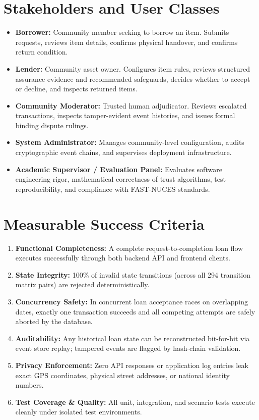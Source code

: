 \section{Stakeholders and User Classes}
\begin{itemize}
    \item \textbf{Borrower:} Community member seeking to borrow an item. Submits requests, reviews item details, confirms physical handover, and confirms return condition.
    \item \textbf{Lender:} Community asset owner. Configures item rules, reviews structured assurance evidence and recommended safeguards, decides whether to accept or decline, and inspects returned items.
    \item \textbf{Community Moderator:} Trusted human adjudicator. Reviews escalated transactions, inspects tamper-evident event histories, and issues formal binding dispute rulings.
    \item \textbf{System Administrator:} Manages community-level configuration, audits cryptographic event chains, and supervises deployment infrastructure.
    \item \textbf{Academic Supervisor / Evaluation Panel:} Evaluates software engineering rigor, mathematical correctness of trust algorithms, test reproducibility, and compliance with FAST-NUCES standards.
\end{itemize}

\section{Measurable Success Criteria}
\begin{enumerate}
    \item \textbf{Functional Completeness:} A complete request-to-completion loan flow executes successfully through both backend API and frontend clients.
    \item \textbf{State Integrity:} 100\% of invalid state transitions (across all 294 transition matrix pairs) are rejected deterministically.
    \item \textbf{Concurrency Safety:} In concurrent loan acceptance races on overlapping dates, exactly one transaction succeeds and all competing attempts are safely aborted by the database.
    \item \textbf{Auditability:} Any historical loan state can be reconstructed bit-for-bit via event store replay; tampered events are flagged by hash-chain validation.
    \item \textbf{Privacy Enforcement:} Zero API responses or application log entries leak exact GPS coordinates, physical street addresses, or national identity numbers.
    \item \textbf{Test Coverage \& Quality:} All unit, integration, and scenario tests execute cleanly under isolated test environments.
\end{enumerate}

